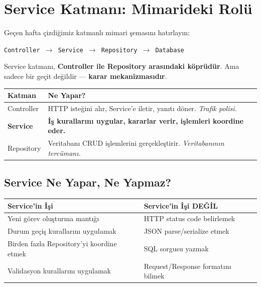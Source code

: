 \documentclass[11pt,a4paper]{article}
\begin{document}
\section{Service Katman{\i}: Mimarideki Rol\"{u}}

Ge\c{c}en hafta \c{c}izdi\u{g}imiz katmanl{\i} mimari \c{s}emas{\i}n{\i} hat{\i}rlay{\i}n:

\begin{center}
\texttt{Controller $\rightarrow$ Service $\rightarrow$ Repository $\rightarrow$ Database}
\end{center}

Service katman{\i}, \textbf{Controller ile Repository aras{\i}ndaki k\"{o}pr\"{u}d\"{u}r}. Ama sadece bir ge\c{c}it de\u{g}ildir --- \textbf{karar mekanizmas{\i}d{\i}r}.

\begin{center}
\begin{tabular}{lp{9cm}}
\toprule
\textbf{Katman} & \textbf{Ne Yapar?} \\
\midrule
Controller & HTTP iste\u{g}ini al{\i}r, Service'e iletir, yan{\i}t{\i} d\"{o}ner. \textit{Trafik polisi.} \\
\textbf{Service} & \textbf{\.{I}\c{s} kurallar{\i}n{\i} uygular, kararlar verir, i\c{s}lemleri koordine eder.} \\
Repository & Veritaban{\i} CRUD i\c{s}lemlerini ger\c{c}ekle\c{s}tirir. \textit{Veritaban{\i}n{\i}n terc\"{u}man{\i}.} \\
\bottomrule
\end{tabular}
\end{center}

\subsection*{Service Ne Yapar, Ne Yapmaz?}

\begin{center}
\begin{tabular}{p{7cm}p{7cm}}
\toprule
\textbf{Service'in \.{I}\c{s}i} & \textbf{Service'in \.{I}\c{s}i DE\u{G}\.{I}L} \\
\midrule
Yeni g\"{o}rev olu\c{s}turma mant{\i}\u{g}{\i} & HTTP status code belirlemek \\
Durum ge\c{c}i\c{s} kurallar{\i}n{\i} uygulamak & JSON parse/serialize etmek \\
Birden fazla Repository'yi koordine etmek & SQL sorgusu yazmak \\
Validasyon kurallar{\i}n{\i} uygulamak & Request/Response format{\i}n{\i} bilmek \\
\bottomrule
\end{tabular}
\end{center}
\end{document}
